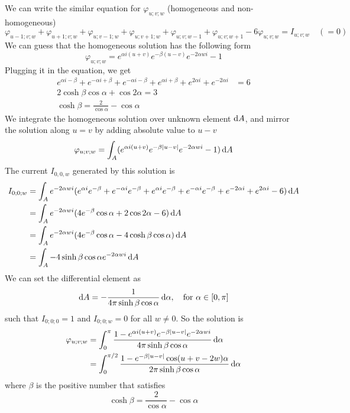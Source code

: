 \documentclass[10pt,a4paper,draft]{article}
\begin{document}
We can write the similar equation for $\varphi_{u;v;w}$ (homogeneous and non-homogeneous)
\[
\varphi_{u-1;v;w} + \varphi_{u+1;v;w} + \varphi_{u;v-1;w} + \varphi_{u;v+1;w} + \varphi_{u;v;w-1}+ \varphi_{u;v;w+1} - 6\varphi_{u;v;w} = I_{u;v;w}\quad(=0)
\]
We can guess that the homogeneous solution has the following form
\[
\varphi_{u;v;w} = e^{\alpha i(u+v)}e^{-\beta(u-v)}e^{-2\alpha w i}-1
\]
Plugging it in the equation, we get
\begin{align*}
e^{\alpha i -\beta} + e^{-\alpha i +\beta}+e^{-\alpha i -\beta}+e^{\alpha i +\beta}+e^{2\alpha i}+e^{-2\alpha i}&= 6\\
2\cosh\beta\cos\alpha + \cos 2\alpha = 3\\
\cosh\beta= \frac{2}{\cos\alpha}-\cos\alpha
\end{align*}
We integrate the homogeneous solution over unknown element $\mathrm{d} A$, and mirror the solution along $u=v$ by adding absolute value to $u-v$
\[
\varphi_{u;v;w} = \int_A(e^{\alpha i(u+v)}e^{-\beta|u-v|}e^{-2\alpha w i}-1) \,\mathrm{d} A
\]
The current $I_{0,0,w}$ generated by this solution is
\begin{align*}
I_{0;0;w} &=  \int_A e^{-2\alpha w i}(e^{\alpha i}e^{-\beta}+e^{-\alpha i}e^{-\beta}+e^{\alpha i}e^{-\beta}+e^{-\alpha i}e^{-\beta}+e^{-2\alpha i}+e^{2\alpha i}-6) \,\mathrm{d} A\\
&= \int_A e^{-2\alpha w i}(4 e^{-\beta}\cos\alpha+2\cos2\alpha-6) \,\mathrm{d} A\\
&= \int_A e^{-2\alpha w i}(4 e^{-\beta}\cos\alpha-4 \cosh\beta\cos\alpha) \,\mathrm{d} A\\
&= \int_A -4 \sinh\beta\cos\alpha e^{-2\alpha w i} \,\mathrm{d} A
\end{align*}
We can set the differential element as 
\[
\mathrm{d} A = -\frac{1}{4\pi \sinh\beta\cos\alpha}\,\mathrm{d}\alpha,\quad \mbox{for } \alpha\in[0, \pi]
\]
such that $I_{0;0;0} = 1$ and $I_{0;0;w} = 0$ for all $w\neq0$. So the solution is
\begin{align*}
\varphi_{u;v;w} &= \int_0^{\pi}\frac{1-e^{\alpha i(u+v)}e^{-\beta|u-v|}e^{-2\alpha w i}}{4\pi \sinh\beta\cos\alpha} \,\mathrm{d}\alpha\\
&= \int_0^{\pi/2}\frac{1-e^{-\beta|u-v|}\cos(u+v-2w)\alpha}{2\pi \sinh\beta\cos\alpha} \,\mathrm{d}\alpha
\end{align*}
where $\beta$ is the positive number that satisfies
\[
\cosh\beta= \frac{2}{\cos\alpha}-\cos\alpha
\]
\end{document}
